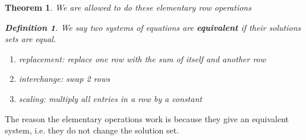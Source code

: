 \documentclass[11pt]{article}
\newtheorem{thm}{Theorem}
\newtheorem{defn}{Definition}
\begin{document}
      \begin{thm}
        We are allowed to do these elementary row operations
        \begin{defn}
          We say two systems of equations are \textbf{equivalent}
          if their solutions sets are equal.
          \end{defn}
        \begin{enumerate}
          \item replacement: replace one row with the sum of itself and another row
          \item interchange: swap 2 rows
                \item scaling: multiply all entries in a  row by a constant
                \end{enumerate}
        \end{thm}
        The reason the elementary operations work is because they
        give an equivalent system, i.e. they do not change the solution set.
\end{document}
